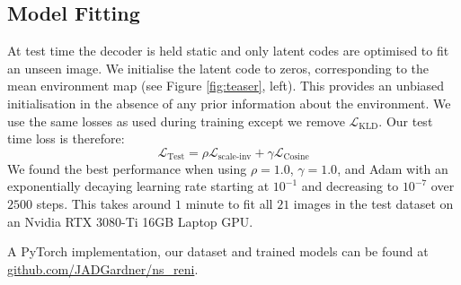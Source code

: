 \subsection{Model Fitting} At test time the decoder is held static and only latent codes are optimised to fit an unseen image. We initialise the latent code to zeros, corresponding to the mean environment map (see Figure \ref{fig:teaser}, left). This provides an unbiased initialisation in the absence of any prior information about the environment. We use the same losses as used during training except we remove $\mathcal{L}_{\text{KLD}}$. Our test time loss is therefore:
\begin{equation}\label{test_loss}
    \mathcal{L}_{\text{Test}} = \rho \mathcal{L}_{\text{scale-inv}} + \gamma \mathcal{L}_{\text{Cosine}}
\end{equation}
We found the best performance when using $\rho = 1.0$, $\gamma = 1.0$, and Adam with an exponentially decaying learning rate starting at \(10^{-1}\) and decreasing to \(10^{-7}\) over $2500$ steps. This takes around $1$ minute to fit all $21$ images in the test dataset on an Nvidia RTX 3080-Ti 16GB Laptop GPU.

A PyTorch implementation, our dataset and trained models can be found at \href{https://github.com/JADGardner/ns_reni}{github.com/JADGardner/ns\_reni}.

